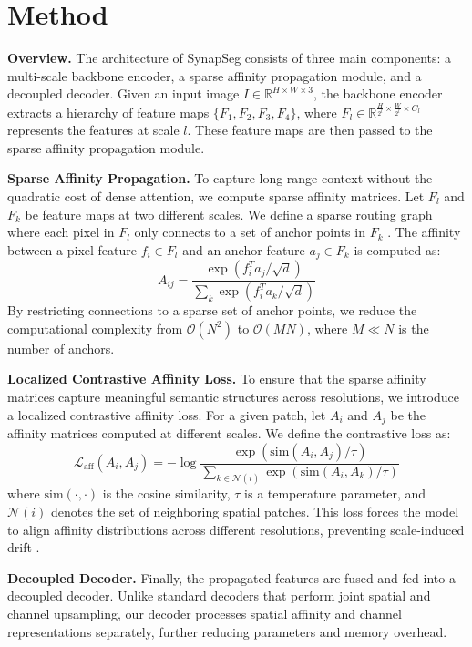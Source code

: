 \section{Method}
\textbf{Overview.} The architecture of SynapSeg consists of three main components: a multi-scale backbone encoder, a sparse affinity propagation module, and a decoupled decoder. Given an input image $I \in \mathbb{R}^{H \times W \times 3}$, the backbone encoder extracts a hierarchy of feature maps $\{F_1, F_2, F_3, F_4\}$, where $F_l \in \mathbb{R}^{\frac{H}{2^l} \times \frac{W}{2^l} \times C_l}$ represents the features at scale $l$. These feature maps are then passed to the sparse affinity propagation module.

\textbf{Sparse Affinity Propagation.} To capture long-range context without the quadratic cost of dense attention, we compute sparse affinity matrices. Let $F_l$ and $F_k$ be feature maps at two different scales. We define a sparse routing graph where each pixel in $F_l$ only connects to a set of anchor points in $F_k$ \cite{smith2021deep}. The affinity between a pixel feature $f_i \in F_l$ and an anchor feature $a_j \in F_k$ is computed as:
\begin{equation}
A_{ij} = \frac{\exp(f_i^T a_j / \sqrt{d})}{\sum_k \exp(f_i^T a_k / \sqrt{d})}
\end{equation}
By restricting connections to a sparse set of anchor points, we reduce the computational complexity from $\mathcal{O}(N^2)$ to $\mathcal{O}(M N)$, where $M \ll N$ is the number of anchors.

\textbf{Localized Contrastive Affinity Loss.} To ensure that the sparse affinity matrices capture meaningful semantic structures across resolutions, we introduce a localized contrastive affinity loss. For a given patch, let $A_i$ and $A_j$ be the affinity matrices computed at different scales. We define the contrastive loss as:
\begin{equation}
\mathcal{L}_{\text{aff}}(A_i, A_j) = -\log \frac{\exp(\text{sim}(A_i, A_j) / \tau)}{\sum_{k \in \mathcal{N}(i)} \exp(\text{sim}(A_i, A_k) / \tau)}
\label{eq:contrastive}
\end{equation}
where $\text{sim}(\cdot,\cdot)$ is the cosine similarity, $\tau$ is a temperature parameter, and $\mathcal{N}(i)$ denotes the set of neighboring spatial patches. This loss forces the model to align affinity distributions across different resolutions, preventing scale-induced drift \cite{kim2024local}.

\textbf{Decoupled Decoder.} Finally, the propagated features are fused and fed into a decoupled decoder. Unlike standard decoders that perform joint spatial and channel upsampling, our decoder processes spatial affinity and channel representations separately, further reducing parameters and memory overhead.

